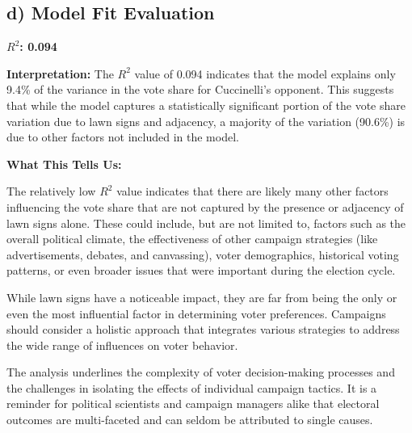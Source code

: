 \documentclass[12pt]{article}
\begin{document}
\subsection*{d) Model Fit Evaluation}

\textbf{\( R^2 \): 0.094}

\textbf{Interpretation:} The \( R^2 \) value of 0.094 indicates that the model explains only 9.4\% of the variance in the vote share for Cuccinelli's opponent. This suggests that while the model captures a statistically significant portion of the vote share variation due to lawn signs and adjacency, a majority of the variation (90.6\%) is due to other factors not included in the model.

\textbf{What This Tells Us:}

The relatively low \( R^2 \) value indicates that there are likely many other factors influencing the vote share that are not captured by the presence or adjacency of lawn signs alone. These could include, but are not limited to, factors such as the overall political climate, the effectiveness of other campaign strategies (like advertisements, debates, and canvassing), voter demographics, historical voting patterns, or even broader issues that were important during the election cycle.

While lawn signs have a noticeable impact, they are far from being the only or even the most influential factor in determining voter preferences. Campaigns should consider a holistic approach that integrates various strategies to address the wide range of influences on voter behavior.

The analysis underlines the complexity of voter decision-making processes and the challenges in isolating the effects of individual campaign tactics. It is a reminder for political scientists and campaign managers alike that electoral outcomes are multi-faceted and can seldom be attributed to single causes.
\end{document}
